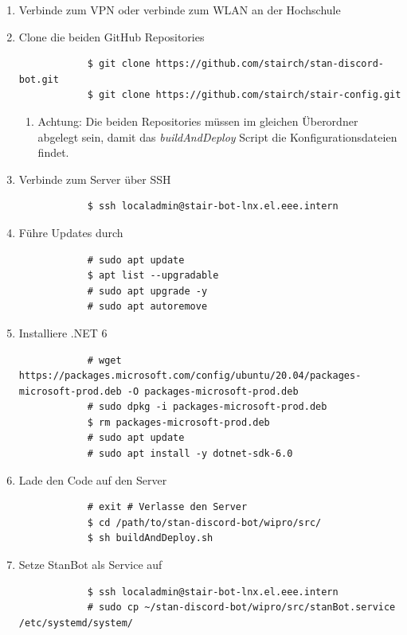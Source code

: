 \documentclass[a4paper, table]{article}
\begin{document}
\begin{enumerate}
    \item Verbinde zum VPN oder verbinde zum WLAN an der Hochschule
    \item Clone die beiden GitHub Repositories
        \begin{verbatim}
            $ git clone https://github.com/stairch/stan-discord-bot.git
            $ git clone https://github.com/stairch/stair-config.git
        \end{verbatim}
        \begin{enumerate}
            \item Achtung: Die beiden Repositories müssen im gleichen Überordner abgelegt sein, damit das \textit{buildAndDeploy} Script die Konfigurationsdateien findet.
        \end{enumerate}
    \item Verbinde zum Server über SSH
        \begin{verbatim}
            $ ssh localadmin@stair-bot-lnx.el.eee.intern
        \end{verbatim}
    \item Führe Updates durch
        \begin{verbatim}
            # sudo apt update
            $ apt list --upgradable
            # sudo apt upgrade -y
            # sudo apt autoremove
        \end{verbatim}
    \item Installiere .NET 6
        \begin{verbatim}
            # wget https://packages.microsoft.com/config/ubuntu/20.04/packages-microsoft-prod.deb -O packages-microsoft-prod.deb
            # sudo dpkg -i packages-microsoft-prod.deb
            $ rm packages-microsoft-prod.deb
            # sudo apt update
            # sudo apt install -y dotnet-sdk-6.0
        \end{verbatim}
    \item Lade den Code auf den Server
        \begin{verbatim}
            # exit # Verlasse den Server
            $ cd /path/to/stan-discord-bot/wipro/src/
            $ sh buildAndDeploy.sh
        \end{verbatim}
    \item Setze StanBot als Service auf
        \begin{verbatim}
            $ ssh localadmin@stair-bot-lnx.el.eee.intern
            # sudo cp ~/stan-discord-bot/wipro/src/stanBot.service /etc/systemd/system/

\end{verbatim}
\end{enumerate}
\end{document}
